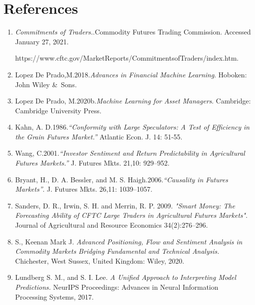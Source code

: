 \documentclass[letterpaper, 12pt]{article}
\begin{document}
\section {References}
\begin{enumerate}
	\item \textit{Commitments of Traders.}.Commodity Futures Trading Commission. Accessed January 27, 2021. 
	
	https://www.cftc.gov/MarketReports/CommitmentsofTraders/index.htm. 
	\item Lopez De Prado,M.2018.\textit{Advances in Financial Machine Learning}. Hoboken: John Wiley \&\ Sons. 
	\item Lopez De Prado, M.2020b.\textit{Machine Learning for Asset Managers}. Cambridge: Cambridge University Press.
	\item Kahn, A. D.1986.\textit{“Conformity with Large Speculators: A Test of Efficiency in the Grain Futures Market.”} Atlantic Econ. J. 14: 51-55.
	\item Wang, C.2001.\textit{“Investor Sentiment and Return Predictability in Agricultural Futures Markets.”} J. Futures Mkts. 21,10: 929–952.
	\item Bryant, H., D. A. Bessler, and M. S. Haigh.2006.\textit{“Causality in Futures Markets”}. J. Futures Mkts. 26,11: 1039–1057.
	\item Sanders, D. R., Irwin, S. H. and Merrin, R. P. 2009. \textit{"Smart Money: The Forecasting Ability of CFTC Large Traders in Agricultural Futures Markets"}. Journal of Agricultural and Resource Economics 34(2):276–296.
	\item S., Keenan Mark J. \textit{Advanced Positioning, Flow and Sentiment Analysis in Commodity Markets Bridging Fundamental and Technical Analysis.} Chichester, West Sussex, United Kingdom: Wiley, 2020. 
	\item Lundberg S. M., and S. I. Lee. \textit{A Unified Approach to Interpreting Model Predictions.} NeurIPS Proceedings: Advances in Neural Information Processing Systems, 2017.
	
\end{enumerate}
\end{document}
